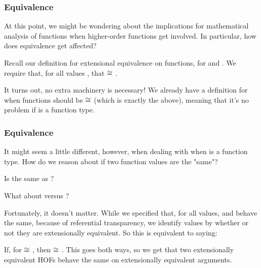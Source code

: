 \documentclass[aspectratio=169, handout]{beamer}
\begin{document}

\begin{frame}[fragile]
  \frametitle{Equivalence}

  At this point, we might be wondering about the implications for mathematical
  analysis of functions when higher-order functions get involved. In particular,
  how does equivalence get affected?
  
  \pause
  \vspace{\fill}

  Recall our definition for extensional equivalence on functions, for 
  and . We require that, for all values , that
   $\cong$ . 
  
  \pause
  \vspace{\fill}

  It turns out, no extra machinery is necessary! We already have a definition for 
  when functions should be $\cong$ (which is exactly the above), meaning that it's
  no problem if  is a function type. 
\end{frame}

\begin{frame}[fragile]
  \frametitle{Equivalence}

  It might seem a little different, however, when dealing with when  is 
  a function type. How do we reason about if two function values are the "same"?

  \pause
  \vspace{\fill}
  
  Is  the same as ? 

  \pause
  \vspace{\fill}

  What about  versus ?

  \pause
  \vspace{\fill}

  Fortunately, it doesn't matter. While we specified that, for all values, 
  and  behave the same, because of referential transparency, we identify values
  by whether or not they are extensionally equivalent. So this is equivalent to saying:

  \pause
  \vspace{\fill}

  If, for  $\cong$ , then  $\cong$ . This goes
  both ways, so we get that two extensionally equivalent HOFs behave the same on
  extensionally equivalent arguments.
\end{frame}
\end{document}
